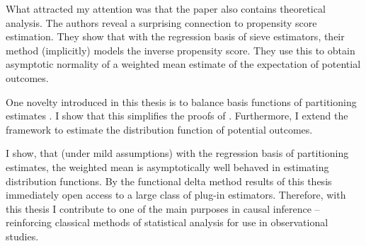 What attracted my attention was that
the paper \cite{Wang2019} also contains theoretical analysis.
The authors reveal a surprising connection to propensity score estimation.
They show that with the regression basis of sieve estimators\cite{Newey1997a}, their method (implicitly) models the inverse propensity score.
They use this to obtain asymptotic normality of a weighted mean estimate of the expectation of potential outcomes.

One novelty introduced in this thesis is to balance basis functions of partitioning estimates \cite[§4]{Gyorfi2002}.
I show that this simplifies the proofs of \cite{Wang2019}.
Furthermore, I extend the framework to estimate the distribution function of potential outcomes.

I show, that (under mild assumptions) with the regression basis of partitioning estimates, the weighted mean is asymptotically well behaved in estimating distribution functions.
By the functional delta method
\cite[§20]{Vaart2000} results of this thesis immediately open access to a large class of plug-in estimators.
Therefore,
with this thesis I contribute to one of the main purposes in causal inference -- reinforcing classical methods of statistical analysis for use in observational studies.



